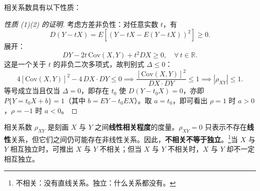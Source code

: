 \documentclass[lang=cn,11pt]{elegantbook}
\begin{document}
\begin{property}\label{prop:correlation}
相关系数具有以下性质：
\end{property}
\begin{proof}[性质 (1)(2) 的证明]
考虑方差非负性：对任意实数 \(t\)，有
\[
D(Y - tX) = E[(Y-tX - E(Y-tX))^2] \geqslant 0.
\]
展开：
\[
DY - 2t\,\mathrm{Cov}(X,Y) + t^2 DX \geqslant 0, \quad \forall\, t \in \mathbb{R}.
\]
这是一个关于 \(t\) 的非负二次多项式，故判别式 \(\Delta \leqslant 0\)：
\[
4[\mathrm{Cov}(X,Y)]^2 - 4\,DX\cdot DY \leqslant 0 \implies \frac{[\mathrm{Cov}(X,Y)]^2}{DX \cdot DY} \leqslant 1 \implies |\rho_{XY}| \leqslant 1.
\]
等号成立当且仅当 \(\Delta=0\)，即存在 \(t_0\) 使 \(D(Y - t_0 X)=0\)，亦即 \(P\{Y=t_0 X + b\}=1\)（其中 \(b = EY - t_0 EX\)）。取 \(a=t_0\)，即可看出 \(\rho=1\) 时 \(a>0\)，\(\rho=-1\) 时 \(a<0\)。
\end{proof}

\begin{note}
相关系数 \(\rho_{XY}\) 是刻画 \(X\) 与 \(Y\) 之间\textbf{线性相关程度}的度量。\(\rho_{XY} = 0\) 只表示不存在\textbf{线性}关系，但它们之间仍可能存在非线性关系。因此，\textbf{不相关不等于独立}。\footnote{不相关：没有直线关系。独立：什么关系都没有。}当 \(X\) 与 \(Y\) 相互独立时，可推出 \(X\) 与 \(Y\) 不相关；但当 \(X\) 与 \(Y\) 不相关时，\(X\) 与 \(Y\) 却不一定相互独立。
\end{note}
\end{document}
